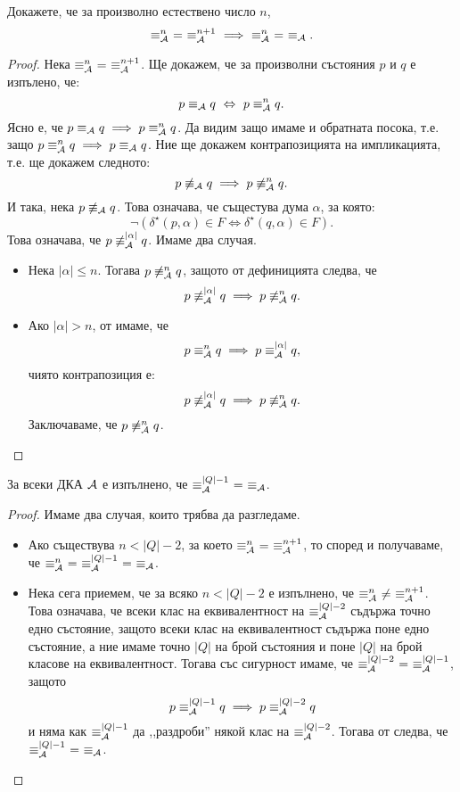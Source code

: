 \begin{proposition}\label{pr:minimisation-cubic:equiv-approx}
  Докажете, че за произволно естествено число $n$,
  \[\equiv^n_\A\ =\ \equiv^{n+1}_\A\ \implies\ \equiv^n_\A\ =\ \equiv_\A.\]
\end{proposition}
\begin{proof}
  Нека $\equiv^n_\A\ =\ \equiv^{n+1}_\A$.
  Ще докажем, че за произволни състояния $p$ и $q$ е изпълено, че:
  \[p \equiv_{\mathcal{A}} q \ \Leftrightarrow\  p \equiv^n_{\mathcal{A}} q.\]
  Ясно е, че $p \equiv_{\mathcal{A}} q \implies p \equiv^n_{\mathcal{A}} q$. 
  Да видим защо имаме и обратната посока, т.е. защо $p \equiv^n_{\mathcal{A}} q \implies p \equiv_{\mathcal{A}} q$.
  Ние ще докажем контрапозицията на импликацията, т.е. ще докажем следното:
  \[p \not\equiv_{\mathcal{A}} q \implies p \not\equiv^n_{\mathcal{A}} q.\]
  И така, нека $p \not\equiv_{\mathcal{A}} q$. Това означава, че същестува дума $\alpha$, за която:
  \[\neg(\delta^\star(p,\alpha) \in F \iff \delta^\star(q,\alpha) \in F).\]
  Това означава, че $p \not\equiv^{|\alpha|}_{\mathcal{A}} q$. Имаме два случая.
  \begin{itemize}
  \item
    Нека $|\alpha| \leq n$.
    Тогава $p \not\equiv^n_{\mathcal{A}} q$, защото от дефиницията следва, че
    \[p \not\equiv^{|\alpha|}_{\mathcal{A}} q \implies p \not\equiv^n_{\mathcal{A}} q.\]
  \item
    Ако $|\alpha| > n$, от  имаме, че
    \[p \equiv^n_{\mathcal{A}} q \implies p \equiv^{|\alpha|}_{\mathcal{A}} q,\]
    чиято контрапозиция е:
    \[p \not\equiv^{|\alpha|}_{\mathcal{A}} q \implies p \not\equiv^{n}_{\mathcal{A}} q.\]
    Заключаваме, че $p \not\equiv^{n}_{\mathcal{A}} q$.
  \end{itemize}
\end{proof}

\begin{proposition}
  За всеки ДКА $\mathcal{A}$ е изпълнено, че 
  $\equiv^{|Q|-1}_\A\ =\ \equiv_\A$.
\end{proposition}
\begin{proof}
  Имаме два случая, които трябва да разгледаме.
  \begin{itemize}
  \item
    Ако съществува $n < |Q| - 2$, за което $\equiv^n_\A\ =\ \equiv^{n+1}_\A$, то според  и 
    получаваме, че $\equiv^n_\A\ =\ \equiv^{|Q|-1}_\A\ =\ \equiv_\A$.
  \item
    Нека сега приемем, че за всяко $n < |Q|-2$ е изпълнено, че $\equiv^n_\A\ \neq\ \equiv^{n+1}_\A$.
    Това означава, че всеки клас на еквивалентност на $\equiv^{|Q|-2}_{\mathcal{A}}$ съдържа точно едно състояние, защото
    всеки клас на еквивалентност съдържа поне едно състояние, а ние имаме точно $|Q|$ на брой състояния и поне $|Q|$ на брой класове на еквивалентност.
    Тогава със сигурност имаме, че $\equiv^{|Q|-2}_{\mathcal{A}}\ =\ \equiv^{|Q|-1}_{\mathcal{A}}$,
    защото
    \[p \equiv^{|Q|-1}_{\mathcal{A}} q \implies p \equiv^{|Q|-2}_{\mathcal{A}} q\]
    и няма как $\equiv^{|Q|-1}_{\mathcal{A}}$ да ,,раздроби'' някой клас на $\equiv^{|Q|-2}_{\mathcal{A}}$.
    Тогава от  следва, че $\equiv^{|Q|-1}_\A\ =\ \equiv_\A$.
  \end{itemize}
\end{proof}

